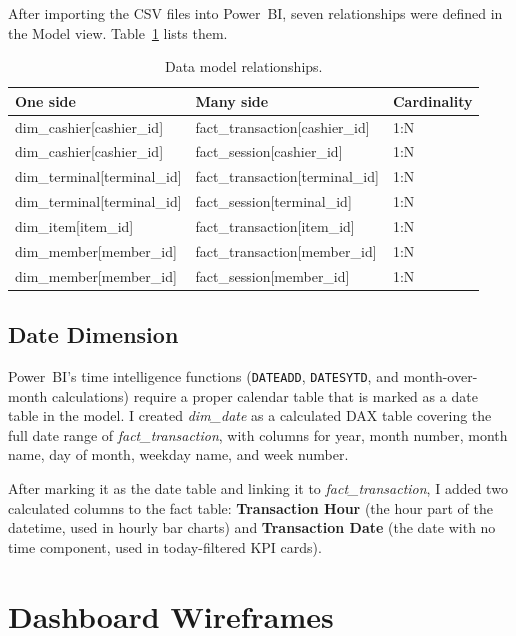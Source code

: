 \documentclass[12pt, a4paper]{report}
\begin{document}
After importing the CSV files into Power~BI, seven relationships were defined in
the Model view. Table~\ref{tab:relationships} lists them.

\begin{table}[H]
  \centering
  \caption{Data model relationships.\label{tab:relationships}}
  \begin{tabular}{p{5.5cm} p{5.5cm} l}
    \toprule
    \textbf{One side} & \textbf{Many side} & \textbf{Cardinality} \\
    \midrule
    dim\_cashier[cashier\_id]   & fact\_transaction[cashier\_id] & 1:N \\
    dim\_cashier[cashier\_id]   & fact\_session[cashier\_id]     & 1:N \\
    dim\_terminal[terminal\_id] & fact\_transaction[terminal\_id]& 1:N \\
    dim\_terminal[terminal\_id] & fact\_session[terminal\_id]    & 1:N \\
    dim\_item[item\_id]         & fact\_transaction[item\_id]    & 1:N \\
    dim\_member[member\_id]     & fact\_transaction[member\_id]  & 1:N \\
    dim\_member[member\_id]     & fact\_session[member\_id]      & 1:N \\
    \bottomrule
  \end{tabular}
\end{table}

\subsection{Date Dimension}

Power~BI's time intelligence functions (\texttt{DATEADD}, \texttt{DATESYTD},
and month-over-month calculations) require a proper calendar table that is marked as
a date table in the model. I created \textit{dim\_date} as a calculated DAX table
covering the full date range of \textit{fact\_transaction}, with columns for year,
month number, month name, day of month, weekday name, and week number.

After marking it as the date table and linking it to \textit{fact\_transaction},
I added two calculated columns to the fact table: \textbf{Transaction Hour}
(the hour part of the datetime, used in hourly bar charts) and
\textbf{Transaction Date} (the date with no time component, used in today-filtered
KPI cards).

\section{Dashboard Wireframes}
\end{document}
